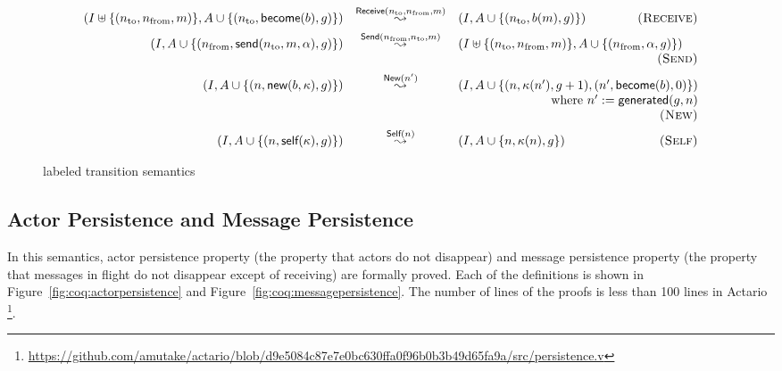 \begin{figure*}[t]
  \begin{displaymath}
    \begin{array}{rcl}
      (I \uplus \{(n_{\textrm{to}}, n_{\textrm{from}}, m)\}, A \cup \{(n_{\textrm{to}}, \textsf{become}(b), g)\}) &
      \overset{\textsf{Receive}(n_{\textrm{to}}, n_{\textrm{from}}, m)}{\leadsto} &
      (I, A \cup \{(n_{\textrm{to}}, b(m), g)\})
      \hfill \textsc{(Receive)} \\[1ex]

      (I, A \cup \{(n_{\textrm{from}}, \textsf{send}(n_{\textrm{to}}, m, \alpha), g)\}) &
      \overset{\textsf{Send}(n_{\textrm{from}}, n_{\textrm{to}}, m)}{\leadsto} &
      (I \uplus \{(n_{\textrm{to}}, n_{\textrm{from}}, m)\}, A \cup \{(n_{\textrm{from}}, \alpha, g)\}) \\
      & & \hfill \textsc{(Send)} \\[1ex]

      (I, A \cup \{(n, \textsf{new}(b, \kappa), g)\}) &
      \overset{\textsf{New}(n')}{\leadsto} &
      (I, A \cup \{(n, \kappa(n'), g + 1), (n', \textsf{become}(b), 0)\}) \\
      & & \hfill \textrm{where}\ n' := \textsf{generated}(g, n) \\
      & & \hfill \textsc{(New)} \\[1ex]

      (I, A \cup \{(n, \textsf{self}(\kappa), g)\}) &
      \overset{\textsf{Self}(n)}{\leadsto} &
      (I, A \cup \{n, \kappa(n), g\})
      \hfill \textsc{(Self)}
    \end{array}
  \end{displaymath}
  \caption{labeled transition semantics}\label{fig:semantics}
\end{figure*}

\subsection{Actor Persistence and Message Persistence}
In this semantics, actor persistence property (the property that actors do not disappear) and message persistence property (the property that messages in flight do not disappear except of receiving) are formally proved.
Each of the definitions is shown in Figure~\ref{fig:coq:actorpersistence} and Figure~\ref{fig:coq:messagepersistence}.
The number of lines of the proofs is less than 100 lines in Actario \footnote{\url{https://github.com/amutake/actario/blob/d9e5084c87e7e0bc630ffa0f96b0b3b49d65fa9a/src/persistence.v}}.


